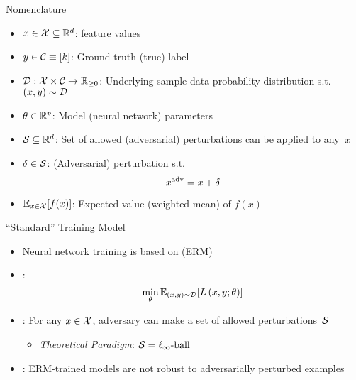 \begin{frame}{Nomenclature}
    

  \begin{itemize}[<+->]
    \setlength{\itemsep}{6pt}
  \item ${x \in \mathcal{X} \subseteq \mathbb{R}^d}$: feature values
    \item ${y \in \mathcal{C} \equiv {\lbrack k\rbrack}}$: Ground truth (true) label
    \item ${\mathcal{D}:\mathcal{X} \times \mathcal{C}\rightarrow\mathbb{R}_{{\geq}0}}$: Underlying sample data probability distribution s.t.\ ${(x,y) \sim \mathcal{D}}$

    \vspace{6pt}
    \item ${\theta \in \mathbb{R}^{p}}$: Model (neural network) parameters

    \vspace{6pt}
  \item ${\mathcal{S} \subseteq \mathbb{R}^{d}}$: Set of allowed (adversarial) perturbations can be applied to any~$x$
    \item ${\delta \in \mathcal{S}}$: (Adversarial) perturbation s.t.
      \begin{equation}\label{eq:AdversarialX}
        x^{\text{adv}} = x + \delta
      \end{equation}

    \vspace{6pt}
    \item $\mathbb{E}_{x \in \mathcal{X}}\lbrack f(x)\rbrack$: Expected value (weighted mean) of $f(x)$
  \end{itemize}
\end{frame}


\begin{frame}{``Standard'' Training Model}
  \begin{itemize}[<+->]
    \setlength{\itemsep}{20pt}
    \item Neural network training is based on \textit{} (ERM)
    \item \textbf{}:
      \begin{equation}\label{eq:ERM}
        \min_{\theta} \mathbb{E}_{(x,y) \sim \mathcal{D}} \lbrack L \left( x, y ; \theta \right)\rbrack
      \end{equation}

    \item \textit{}: For any ${x \in \mathcal{X}}$, adversary can make a set of allowed perturbations~$\mathcal{S}$
      \begin{itemize}
        \item \textit{Theoretical Paradigm}: $\mathcal{S} = \ell_{\infty}\text{-ball}$
      \end{itemize}

    \item \textbf{}: ERM-trained models are not robust to adversarially perturbed examples~\cite{Biggio:2013,Szegedy:2013}
  \end{itemize}
\end{frame}


